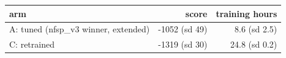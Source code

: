 \begin{tabular}{lrr}
\toprule
arm & score & training hours \\
\midrule
A: tuned (nfsp\_v3 winner, extended) & -1052 (sd 49) & 8.6 (sd 2.5) \\
C: retrained & -1319 (sd 30) & 24.8 (sd 0.2) \\
\bottomrule
\end{tabular}
